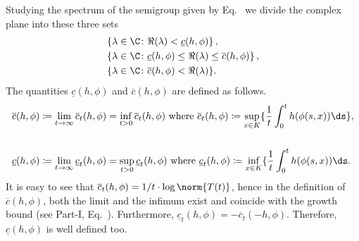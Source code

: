 Studying the spectrum of the semigroup given by Eq.~ we divide the complex plane into these three sets
\begin{equation}\label{eq:b3-4.3}
	\begin{split}	 
		&\{\lambda \in \C \colon \Re(\lambda) < \underline{c}(h,\phi)\}\,, \\
		&\{\lambda \in \C \colon \underline{c}(h,\phi) \leq \Re(\lambda) \leq \overline{c}(h,\phi)\}\,, \\
		&\{\lambda \in \C \colon \overline{c}(h,\phi) < \Re(\lambda)\}.
	\end{split}
\end{equation}
The quantities $\underline{c}(h,\phi)$ and $\overline{c}(h,\phi)$ are defined as follows.
\begin{align}\label{eq:b3-4.4}
		&\overline{c}(h,\phi) \coloneq \lim_{t\to\infty} \overline{c}_{t}(h,\phi) = \inf_{t>0} \overline{c}_{t}(h,\phi) \text{ where } 
		\overline{c}_{t}(h,\phi) \coloneq \sup_{x\in K} \{\frac{1}{t}\int_{0}^{t} h(\phi(s,x)) \ds \},\notag
        \\& \\ \notag
		&\underline{c}(h,\phi) \coloneq \lim_{t\to\infty} \underline{c}_{t}(h,\phi) = \sup_{t>0} \underline{c}_{t}(h,\phi) \text{ where } 
		\underline{c}_{t}(h,\phi) \coloneq \inf_{x\in K} \{\frac{1}{t}\int_{0}^{t} h(\phi(s,x)) \ds.
\end{align}
It is easy to see that $\overline{c}_{t}(h,\phi) = 1/t\cdot\log\norm{T(t)}$, hence in the definition of\/ $\overline{c}(h,\phi)$, both the limit and the infimum exist and coincide with the growth bound (see Part-I, Eq.~).
Furthermore, $\underline{c}_{t}(h,\phi) = -\overline{c}_{t}(-h,\phi)$.
Therefore, $\underline{c}(h,\phi)$ is well defined too.

